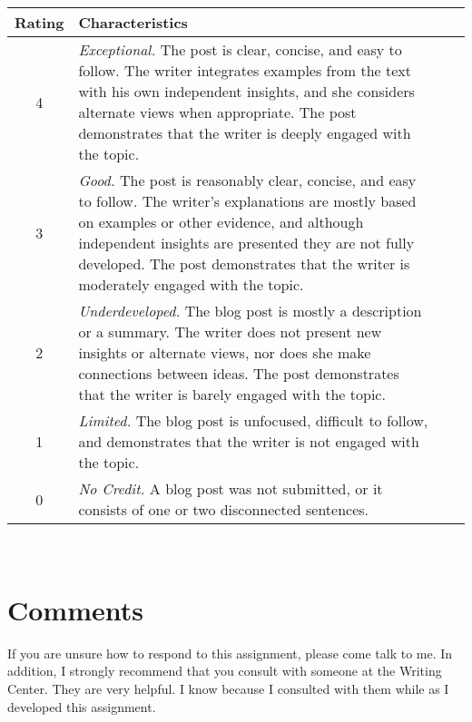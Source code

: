 \documentclass[12pt,letterpaper]{article}
\begin{document}
\begin{minipage}{\linewidth}
\centering

\begin{tabular}{|c|p{14cm}|l|c|}\toprule[1.25pt]
\bf Rating	& \bf Characteristics\\\midrule
4	& \emph{Exceptional.} The post is clear, concise, and easy to follow. The writer integrates examples from the text with his own independent insights, and she considers alternate views when appropriate. The post demonstrates that the writer is deeply engaged with the topic.\\ \hline

3	& \emph{Good.} The post is reasonably clear, concise, and easy to follow. The writer's explanations are mostly based on examples or other evidence, and although independent insights are presented they are not fully developed. The post demonstrates that the writer is moderately engaged with the topic.\\ \hline

2	& \emph{Underdeveloped.} The blog post is mostly a description or a summary. The writer does not present new insights or alternate views, nor does she make connections between ideas. The post demonstrates that the writer is barely engaged with the topic.\\ \hline

1	& \emph{Limited.} The blog post is unfocused, difficult to follow, and demonstrates that the writer is not engaged with the topic.\\ \hline

0	& \emph{No Credit.} A blog post was not submitted, or it consists of one or two disconnected sentences.\\ \hline

\bottomrule[1.25pt]

\end {tabular}\par
\end{minipage}\\

\section *{Comments}
If you are unsure how to respond to this assignment, please come talk to me.  In addition, I strongly recommend that you consult with someone at the Writing Center.  They are very helpful.  I know because I consulted with them while as I developed this assignment.
\end{document}
